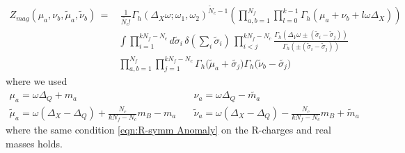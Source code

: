 \begin{equation}
\begin{aligned}
Z_{mag} ( \mu_a , \nu_b , \tilde{\mu}_a, \tilde{\nu}_b ) \,= & \, \frac{1}{\tilde{N_c}!}
 \Gamma_h ( \Delta_X \omega ; \omega_1 , \omega_2)^{ \tilde N_c-1}
\left( \prod_{a,b=1}^{N_f}   \prod_{l=0}^{k-1} \Gamma_h \left( \mu_a+  \nu_b + l \omega \Delta_X \right)  \right) \\
&\int
\prod_{i=1}^{ kN_f - N_c} d \tilde{\sigma}_i \, \delta( \sum_i \tilde{\sigma}_i) \,
 \prod_{i<j}^{kN_f - N_c} \frac{ \Gamma_h( \Delta_Y \omega \pm (\tilde{\sigma}_i - \tilde{\sigma}_j)) }{ \Gamma_h ( \pm (\tilde{\sigma}_i - \tilde{\sigma}_j) )} \\
 &  \prod_{a,b=1}^{N_f} \prod_{j=1}^{k N_f - N_c} \Gamma_h \big( \tilde{ \mu}_a + \tilde{\sigma_j} \big) \Gamma_h \big( \tilde{\nu}_b - \tilde{\sigma_j} \big)
\end{aligned}
\end{equation}
where we used
\begin{equation}
\begin{aligned}
 \mu_a = \omega \Delta_Q + m_a  
 &\quad \nu_a = \omega \Delta_Q - \tilde{m_a}\\
 \tilde \mu_a = \omega ( \Delta_X - \Delta_Q ) + \frac{N_c}{k N_f - N_c} m_B - m_a  
 &  \quad \tilde \nu_a = \omega ( \Delta_X - \Delta_Q ) - \frac{N_c}{k N_f - N_c} m_B + \tilde m_a
\end{aligned}
\end{equation}
where the same condition \eqref{eqn:R-symm Anomaly} on the R-charges and real masses  holds.\\

